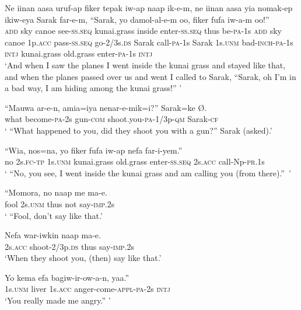 \ea
\gll  Ne  iinan  aasa  uruf-ap  fiker  tepak  iw-ap naap  ik-e-m,  ne  iinan  aasa  yia  nomak-ep ikiw-eya  Sarak  far-e-m,  “Sarak,  yo  damol-al-e-m oo,  fiker  fufa  iw-a-m  oo!” \\
\textsc{add}  sky  canoe  see-\textsc{ss.seq}  kunai.grass  inside  enter-\textsc{ss.seq} thus  be-\textsc{pa}-1s  \textsc{add}  sky  canoe  1p.\textsc{acc}  pass-\textsc{ss.seq} go-2/3s.\textsc{ds}  Sarak  call-\textsc{pa}-1s  Sarak  1s.\textsc{unm}  bad-\textsc{inch}-\textsc{pa}-1s \textsc{intj}  kunai.grass  old.grass  enter-\textsc{pa}-1s  \textsc{intj} \\ 
\glt ‘And when I saw the planes I went inside the kunai grass and stayed like that, and when the planes passed over us and went I called to Sarak, “Sarak, oh I'm in a bad way, I am hiding among the kunai grass!” ’ \\
\z


\ea
\gll  “Mauwa  ar-e-n,  amia=iya  nenar-e-mik=i?”  Sarak=ke  Ø. \\
what  become-\textsc{pa}-2s  gun-\textsc{com}  shoot.you-\textsc{pa}-1/3p-\textsc{qm} Sarak-\textsc{cf} \\ 
\glt ‘ “What happened to you, did they shoot you with a gun?” Sarak (asked).’ \\
\z


\ea
\gll  “Wia,  nos=na,  yo  fiker  fufa  iw-ap nefa  far-i-yem.” \\
no  2s.\textsc{fc}-\textsc{tp}  1s.\textsc{unm}  kunai.grass  old.grass  enter-\textsc{ss.seq} 2s.\textsc{acc}  call-Np-\textsc{pr}.1s \\
\glt ‘ “No, you see, I went inside the kunai grass and am calling you (from there).”~’ \\
\z


\ea
\gll  “Momora,  no  naap  me  ma-e. \\
fool  2s.\textsc{unm}  thus  not  say-\textsc{imp}.2s \\
\glt ‘ “Fool, don’t say like that.’ \\
\z


\ea
\gll  Nefa  war-iwkin  naap  ma-e. \\
2s.\textsc{acc}  shoot-2/3p.\textsc{ds}  thus  say-\textsc{imp}.2s \\
\glt ‘When they shoot you, (then) say like that.’ \\
\z


\ea
\gll  Yo  kema  efa  bagiw-ir-ow-a-n,  yaa.” \\
1s.\textsc{unm}  liver  1s.\textsc{acc}  anger-come-\textsc{appl}-\textsc{pa}-2s  \textsc{intj} \\
\glt ‘You really made me angry.” ’ \\
\z


